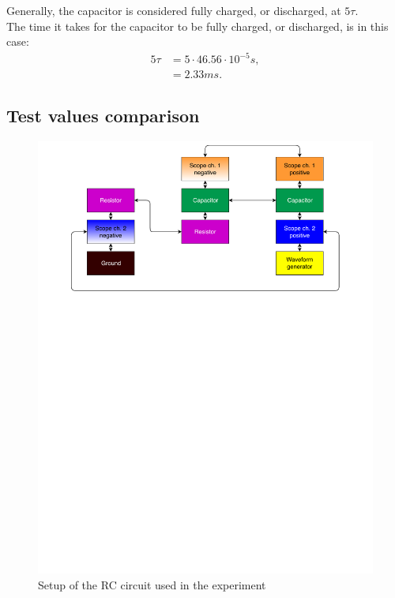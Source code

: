 \noindent Generally, the capacitor is considered fully charged, or discharged, at $5\tau$. \\
The time it takes for the capacitor to be fully charged, or discharged, is in this case:
\begin{align*}
5\tau &= 5 \cdot 46.56 \cdot 10^{-5} s, \\
&= 2.33 ms.
\end{align*}

\subsection{Test values comparison}
\begin{figure}[H]
	\center
		\includegraphics[clip, trim=0cm 18cm 0cm 0cm, scale=0.6]{fig/img/test_circuit_1}
	\caption{Setup of the RC circuit used in the experiment}
	\label{rc_flow}
\end{figure}
